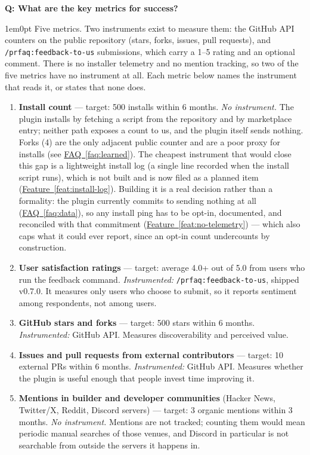 \documentclass[11pt,letterpaper]{article}
\newcounter{faqnum}
\newenvironment{faqpair}[1]{%
  \needspace{4\baselineskip}%
  \vspace{0.5em}%
  \refstepcounter{faqnum}%
  \noindent\textbf{\color{SectionBlue}Q\thefaqnum: #1}\par\nopagebreak[4]%
  \vspace{0.2em}%
  \begin{adjustwidth}{1em}{0pt}%
  \setlength{\parindent}{0pt}%
}{%
  \end{adjustwidth}%
  \vspace{0.5em}%
}
\newcommand{\faqref}[1]{\hyperref[#1]{FAQ~\ref*{#1}}}
\newcommand{\featureref}[1]{\hyperref[#1]{Feature~\ref*{#1}}}
\begin{document}
\begin{faqpair}{What are the key metrics for success?}\label{faq:key-metrics}
  Five metrics. Two instruments exist to measure them: the GitHub API counters on the public repository (stars, forks, issues, pull requests), and \texttt{/prfaq:feedback-to-us} submissions, which carry a 1--5 rating and an optional comment. There is no installer telemetry and no mention tracking, so two of the five metrics have no instrument at all. Each metric below names the instrument that reads it, or states that none does.

  \begin{enumerate}[nosep]
    \item \textbf{Install count} --- target: 500 installs within 6 months. \textit{No instrument.} The plugin installs by fetching a script from the repository and by marketplace entry; neither path exposes a count to us, and the plugin itself sends nothing. Forks (4) are the only adjacent public counter and are a poor proxy for installs (see \faqref{faq:learned}). The cheapest instrument that would close this gap is a lightweight install log (a single line recorded when the install script runs), which is not built and is now filed as a planned item (\featureref{feat:install-log}). Building it is a real decision rather than a formality: the plugin currently commits to sending nothing at all (\faqref{faq:data}), so any install ping has to be opt-in, documented, and reconciled with that commitment (\featureref{feat:no-telemetry}) --- which also caps what it could ever report, since an opt-in count undercounts by construction.
    \item \textbf{User satisfaction ratings} --- target: average 4.0+ out of 5.0 from users who run the feedback command. \textit{Instrumented:} \texttt{/prfaq:feedback-to-us}, shipped v0.7.0. It measures only users who choose to submit, so it reports sentiment among respondents, not among users.
    \item \textbf{GitHub stars and forks} --- target: 500 stars within 6 months. \textit{Instrumented:} GitHub API. Measures discoverability and perceived value.
    \item \textbf{Issues and pull requests from external contributors} --- target: 10 external PRs within 6 months. \textit{Instrumented:} GitHub API. Measures whether the plugin is useful enough that people invest time improving it.
    \item \textbf{Mentions in builder and developer communities} (Hacker News, Twitter/X, Reddit, Discord servers) --- target: 3 organic mentions within 3 months. \textit{No instrument.} Mentions are not tracked; counting them would mean periodic manual searches of those venues, and Discord in particular is not searchable from outside the servers it happens in.
  \end{enumerate}


\end{faqpair}
\end{document}
